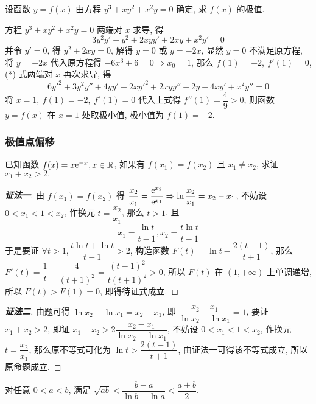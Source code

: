 \begin{example}[2014 数一]
    设函数 $y=f(x)$ 由方程 $y^3+xy^2+x^2y=0$ 确定, 求 $f(x)$ 的极值.
\end{example}
\begin{solution}
    方程 $y^3+xy^2+x^2y=0$ 两端对 $x$ 求导, 得 
    \begin{equation*}
        3y^2y'+y^2+2xyy'+2xy+x^2y'=0
        \tag{*}
    \end{equation*}
    并令 $y'=0$, 得 $y^2+2xy=0$, 解得 $y=0$ 或 $y=-2x$, 
    显然 $y=0$ 不满足原方程, 将 $y=-2x$ 代入原方程得 $-6x^3+6=0\Rightarrow x_0=1$, 那么 $f(1)=-2,~f'(1)=0$, (*) 式两端对 $x$ 再次求导, 得 
    $$6y'^2+3y^2y''+4yy'+2xy'^2+2xyy''+2y+4xy'+x^2y''=0$$
    将 $x=1,~f(1)=-2,~f'(1)=0$ 代入上式得 $f''(1)=\dfrac{4}{9}>0$, 
    则函数 $y=f(x)$ 在 $x=1$ 处取极小值, 极小值为 $f(1)=-2.$
\end{solution}

\subsubsection{极值点偏移}

\begin{example}
    已知函数 $f(x)=x\mathrm{e}^{-x},x\in\mathbb{R}$, 如果有 $f(x_1)=f(x_2)$ 且 $x_1\neq x_2$, 求证 $x_1+x_2>2.$
\end{example}
\begin{proof}[{\songti \textbf{证法一}}]
    由 $f(x_1)=f(x_2)$ 得 $\dfrac{x_2}{x_1}=\dfrac{\mathrm{e}^{x_2}}{\mathrm{e}^{x_1}}\Rightarrow \ln\dfrac{x_2}{x_1}=x_2-x_1$, 不妨设 $0<x_1<1<x_2$, 作换元 $t=\dfrac{x_2}{x_1}$, 那么 $t>1$, 且
    $$x_1=\dfrac{\ln t}{t-1},x_2=\dfrac{t\ln t}{t-1}$$
    于是要证 $\forall t>1,\dfrac{t\ln t+\ln t}{t-1}>2$, 构造函数 $F(t)=\ln t-\dfrac{2(t-1)}{t+1}$, 那么 $F'(t)=\dfrac{1}{t}-\dfrac{4}{(t+1)^2}=\dfrac{(t-1)^2}{t(t+1)^2}>0$, 所以 $F(t)$ 在 $(1,+\infty)$ 上单调递增, 所以 $F(t)>F(1)=0$, 即得待证式成立.
\end{proof}
\begin{proof}[{\songti \textbf{证法二}}]
    由题可得 $\ln x_2-\ln x_1=x_2-x_1$, 即 $\dfrac{x_2-x_1}{\ln x_2-\ln x_1}=1$, 要证 $x_1+x_2>2$, 即证 $x_1+x_2>2\dfrac{x_2-x_1}{\ln x_2-\ln x_1}$, 
    不妨设 $0<x_1<1<x_2$, 作换元 $t=\dfrac{x_2}{x_1}$, 那么原不等式可化为 $\ln t>\dfrac{2(t-1)}{t+1}$, 由证法一可得该不等式成立, 所以原命题成立.
\end{proof}

\begin{theorem}
    对任意 $0<a<b$, 满足 $\sqrt{ab}<\dfrac{b-a}{\ln b-\ln a}<\dfrac{a+b}{2}.$
\end{theorem}

